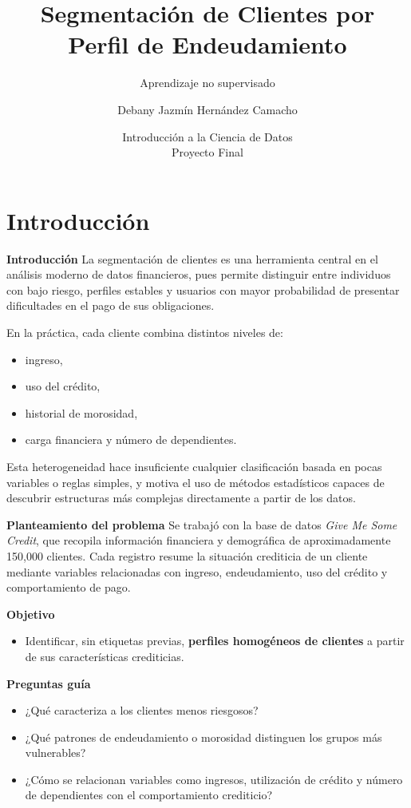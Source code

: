 \documentclass[10pt]{beamer}
\title[Segmentación por endeudamiento]{Segmentación de Clientes por Perfil de Endeudamiento}
\subtitle{Aprendizaje no supervisado}
\author[Debany Hernández]{Debany Jazmín Hernández Camacho}
\institute[CIMAT]{Maestría en Matemáticas Aplicadas \\ Centro de Investigación en Matemáticas (CIMAT) \\ debany.hernandez@cimat.mx}
\date[Proyecto final]{Introducción a la Ciencia de Datos \\ Proyecto Final}
\begin{document}
\frame{\titlepage}


\section{Introducción}
\begin{frame}{ \textbf{Introducción}}
La segmentación de clientes es una herramienta central en el análisis moderno de datos financieros,
pues permite distinguir entre individuos con bajo riesgo, perfiles estables y usuarios con mayor
probabilidad de presentar dificultades en el pago de sus obligaciones.

\vspace{0.3cm}

En la práctica, cada cliente combina distintos niveles de:
\begin{itemize}
    \item ingreso,
    \item uso del crédito,
    \item historial de morosidad,
    \item carga financiera y número de dependientes.
\end{itemize}

Esta heterogeneidad hace insuficiente cualquier clasificación basada en pocas variables o reglas
simples, y motiva el uso de métodos estadísticos capaces de descubrir estructuras más complejas
directamente a partir de los datos.
\end{frame}


\begin{frame}{\textbf{Planteamiento del problema }}
Se trabajó con la base de datos \textit{Give Me Some Credit}, que recopila información
financiera y demográfica de aproximadamente 150{,}000 clientes. Cada registro resume la situación
crediticia de un cliente mediante variables relacionadas con ingreso, endeudamiento, uso del crédito
y comportamiento de pago.

\vspace{0.3cm}

\textbf{Objetivo}
\begin{itemize}
    \item Identificar, sin etiquetas previas, \textbf{perfiles homogéneos de clientes} a partir de sus
    características crediticias.
\end{itemize}

\textbf{Preguntas guía}
\begin{itemize}
    \item ¿Qué caracteriza a los clientes menos riesgosos?
    \item ¿Qué patrones de endeudamiento o morosidad distinguen los grupos más vulnerables?
    \item ¿Cómo se relacionan variables como ingresos, utilización de crédito y número de dependientes con el 
    comportamiento crediticio?
\end{itemize}
\end{frame}
\end{document}
